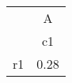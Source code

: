 \begin{tabular}{l*{1}{c}}
\hline\hline
            &           A\\
            &          c1\\
\hline
r1          &        0.28\\
\hline\hline
\end{tabular}
